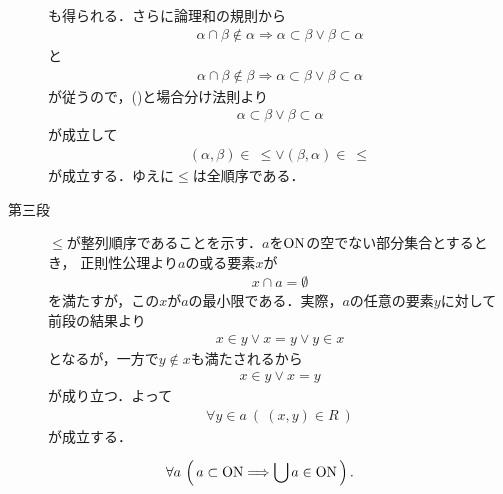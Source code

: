 \begin{prf}
\begin{description}
\begin{align}
				\end{align}
				も得られる．さらに論理和の規則から
				\begin{align}
					\alpha \cap \beta \notin \alpha \Longrightarrow \alpha \subset \beta \vee \beta \subset \alpha
				\end{align}
				と
				\begin{align}
					\alpha \cap \beta \notin \beta \Longrightarrow \alpha \subset \beta \vee \beta \subset \alpha
				\end{align}
				が従うので，()と場合分け法則より
				\begin{align}
					\alpha \subset \beta \vee \beta \subset \alpha
				\end{align}
				が成立して
				\begin{align}
					(\alpha,\beta) \in\ \leq \vee (\beta,\alpha) \in\ \leq
				\end{align}
				が成立する．ゆえに$\leq$は全順序である．
			
			\item[第三段]
				$\leq$が整列順序であることを示す．$a$を$\ON$の空でない部分集合とするとき，
				正則性公理より$a$の或る要素$x$が
				\begin{align}
					x \cap a = \emptyset
				\end{align}
				を満たすが，この$x$が$a$の最小限である．実際，$a$の任意の要素$y$に対して
				前段の結果より
				\begin{align}
					x \in y \vee x = y \vee y \in x
				\end{align}
				となるが，一方で$y \notin x$も満たされるから
				\begin{align}
					x \in y \vee x = y
				\end{align}
				が成り立つ．よって
				\begin{align}
					\forall y \in a\ (\ (x,y) \in R\ )
				\end{align}
				が成立する．
				\QED
		\end{description}
	\end{prf}
	
	\begin{screen}
		\begin{thm}[$\ON$の部分集合の合併は順序数となる]\label{thm:union_of_set_of_ordinal_numbers_is_ordinal}
			\begin{align}
				\forall a\,
				\left(\, a \subset \mathrm{ON} \Longrightarrow \bigcup a \in \mathrm{ON}\, \right).
			\end{align}
		\end{thm}
	\end{screen}
	
